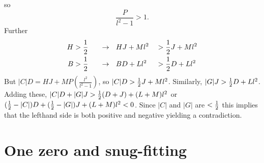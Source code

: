 so
\begin{equation*}
\frac{P}{l^2-1} > 1.
\end{equation*}
Further
\begin{alignat*}{3}
H &> \frac{1}{2} ~~&&\rightarrow~~ HJ+Ml^2 &&> \frac{1}{2} J+Ml^2 \\
B &> \frac{1}{2} ~~&&\rightarrow~~ BD+Ll^2 &&> \frac{1}{2} D+Ll^2
\end{alignat*}
But $|C|D = HJ+MP(\frac{l^2}{l^2-1})$, so $|C|D >
\frac{1}{2} J+Ml^2$.  Similarly, $|G|J > \frac{1}{2} D+Ll^2$.
Adding these, $|C|D + |G|J > \frac{1}{2}(D+J)+(L+M)l^2$ or $(\frac{1}{2}-|C|)D
+ (\frac{1}{2}-|G|)J + (L+M)l^2 < 0$.  Since $|C|$ and $|G|$ are $<
\frac{1}{2}$ this implies that the lefthand side is both positive and
negative yielding a contradiction.

\section*{One zero and snug-fitting}

